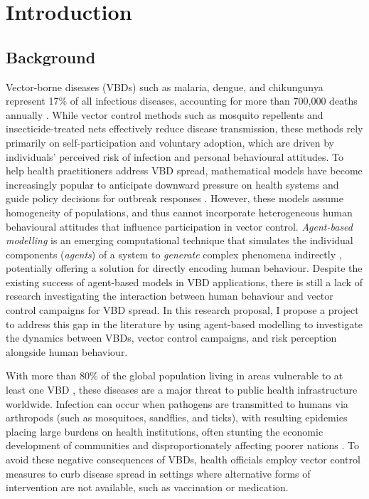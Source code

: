 \section{Introduction}

\subsection{Background}

Vector-borne diseases (VBDs) such as malaria, dengue, and chikungunya represent 17\% of all infectious diseases, accounting for more than 700,000 deaths annually \cite{world_health_organisation_who_vector-borne_2020}. While vector control methods such as mosquito repellents and insecticide-treated nets effectively reduce disease transmission, these methods rely primarily on self-participation and voluntary adoption, which are driven by individuals' perceived risk of infection and personal behavioural attitudes. To help health practitioners address VBD spread, mathematical models have become increasingly popular to anticipate downward pressure on health systems and guide policy decisions for outbreak responses \cite{reiner_systematic_2013}. However, these models assume homogeneity of populations, and thus cannot incorporate heterogeneous human behavioural attitudes that influence participation in vector control. \textit{Agent-based modelling} is an emerging computational technique that simulates the individual components (\textit{agents}) of a system to \textit{generate} complex phenomena indirectly \cite{epstein_growing_1996}, potentially offering a solution for directly encoding human behaviour. Despite the existing success of agent-based models in VBD applications, there is still a lack of research investigating the interaction between human behaviour and vector control campaigns for VBD spread. In this research proposal, I propose a project to address this gap in the literature by using agent-based modelling to investigate the dynamics between VBDs, vector control campaigns, and risk perception alongside human behaviour.

With more than 80\% of the global population living in areas vulnerable to at least one VBD \cite{golding_integrating_2015}, these diseases are a major threat to public health infrastructure worldwide. Infection can occur when pathogens are transmitted to humans via arthropods (such as mosquitoes, sandflies, and ticks), with resulting epidemics placing large burdens on health institutions, often stunting the economic development of communities and disproportionately affecting poorer nations \cite{lum_cost_2009, degroote_interventions_2018}. To avoid these negative consequences of VBDs, health officials employ vector control measures to curb disease spread in settings where alternative forms of intervention are not available, such as vaccination or medication.

